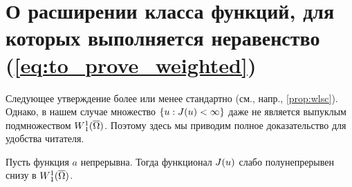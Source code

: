 \section{О расширении класса функций, для которых выполняется неравенство (\ref{eq:to_prove_weighted})}



Следующее утверждение более или менее стандартно (см., напр., \ref{prop:wlsc}).
Однако, в нашем случае множество $\{u: J(u) < \infty\}$ даже не является выпуклым подмножеством $\W(\overline{\Omega})$.
Поэтому здесь мы приводим полное доказательство для удобства читателя.

\begin{lm}
\label{lm:lowersemi}
Пусть функция $a$ непрерывна.
Тогда функционал $J(u)$ слабо полунепрерывен снизу в $\W(\overline{\Omega})$.
\end{lm}

